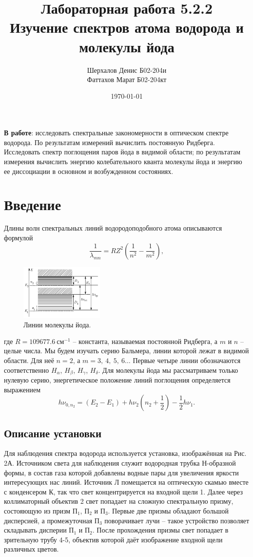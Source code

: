 \documentclass[a4paper,12pt]{article}
\author{Шерхалов Денис Б02-204и \\
		Фаттахов Марат Б02-204кт}
\title{Лабораторная работа 5.2.2 \\
	\textbf{Изучение спектров атома водорода и молекулы йода}}
\date{\today}
\theoremstyle{definition}
\begin{document}
	
{\Large \maketitle}

\textbf{В работе}: исследовать спектральные закономерности в оптическом спектре водорода. По результатам измерений вычислить постоянную Ридберга. Исследовать спектр поглощения паров йода в видимой области; по результатам измерения вычислить энергию колебательного кванта молекулы йода и энергию ее диссоциации в основном и возбужденном состояниях.

	\section{Введение}	
	Длины волн спектральных линий водородоподобного атома описываются формулой
	\begin{equation}
	\dfrac{1}{\lambda_{mn}} = RZ^2 \left( \dfrac{1}{n^2} - \dfrac{1}{m^2} \right),
	\end{equation}

	\begin{figure}
	\includegraphics[width = 0.37\textwidth]{1.png}
	\centering
	\caption{Линии молекулы йода.}
	\end{figure}

	где $R = 109677.6~\text{см}^{-1}$ -- константа, называемая постоянной Ридберга, а $m$ и $n$ -- целые числа. Мы будем изучать серию Бальмера, линии которой лежат в видимой области. Для неё $n = 2$, а $m = 3,~4,~5,~6\dots$ Первые четыре линии обозначаются соответственно $H_\alpha$, $H_\beta$, $H_\gamma$, $H_\delta$.
	Для молекулы йода мы рассматриваем только нулевую серию, энергетическое положение линий поглощения определяется выражением
	\begin{equation}
	h\nu_{0, n_2} = (E_2 - E_1) + h\nu_2 \left( n_2 + \dfrac{1}{2} \right) - \dfrac{1}{2} h \nu_1.
	\end{equation}
	\subsection*{Описание установки}
	Для наблюдения спектра водорода используется установка, изображённая на Рис. 2А. Источником света для наблюдения служит водородная трубка Н-образной формы, в состав газа которой добавлены водные пары для увеличения яркости интересующих нас линий. Источник Л помещается на оптическую скамью вместе с конденсером К, так что свет концентрируется на входной щели 1. Далее через коллиматорный объектив 2 свет попадает на сложную спектральную призму, состояющую из призм П$_1$, П$_2$ и П$_3$. Первые две призмы обладают большой дисперсией, а промежуточная П$_3$ поворачивает лучи -- такое устройство позволяет складывать дисперии П$_1$ и П$_2$. После прохождения призмы свет попадает в зрительную трубу 4-5, объектив которой даёт изображение входной щели различных цветов.
	\newpage
\end{document}
